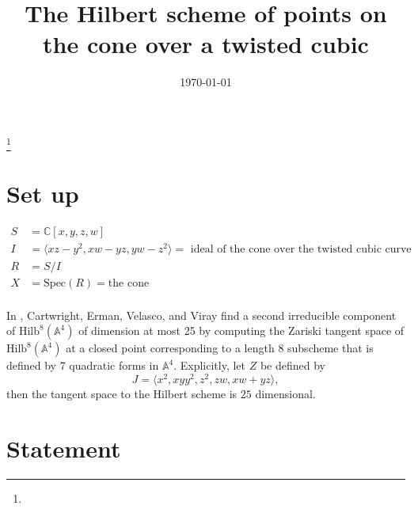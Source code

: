 \documentclass{amsart}[12pt]
\theoremstyle{definition}
\theoremstyle{remark}
\numberwithin{equation}{section}
\begin{document}
\title[The Hilbert scheme of points on the cone over a twisted cubic]{The Hilbert scheme of points on the cone over a twisted cubic}%
\address{University of Illinois at Chicago, 851 South Morgan Street, Science and Engineering Offices m/c249, Chicago, IL 60607 USA}%
%

\thanks{}%
\subjclass{}%

\keywords{}%

\date{\today}%

\maketitle

\section{Set up}
\begin{align*}
S & = \mathbb{C}[x, y, z, w] \\
I & = \langle xz - y^2, xw - yz, yw - z^2 \rangle = \textrm{ ideal of the cone over the twisted cubic curve}\\
R & = S / I \\
X & = \mathrm{Spec}(R) = \textrm{the cone}\\
\end{align*}

In \cite[Proposition 5.1]{8points}, Cartwright, Erman, Velasco, and Viray find a second irreducible component of $\mathrm{Hilb}^8(\mathbb{A}^4)$ of dimension at most 25 by computing the Zariski tangent space of $\mathrm{Hilb}^8(\mathbb{A}^4)$ at a closed point corresponding to a length $8$ subscheme that is defined by 7 quadratic forms in $\mathbb{A}^4$. Explicitly, let $Z$ be defined by 
\[
J = \langle x^2, xy y^2, z^2, zw, xw + yz \rangle,
\]
then the tangent space to the Hilbert scheme is $25$ dimensional.

\section{Statement}
\end{document}
